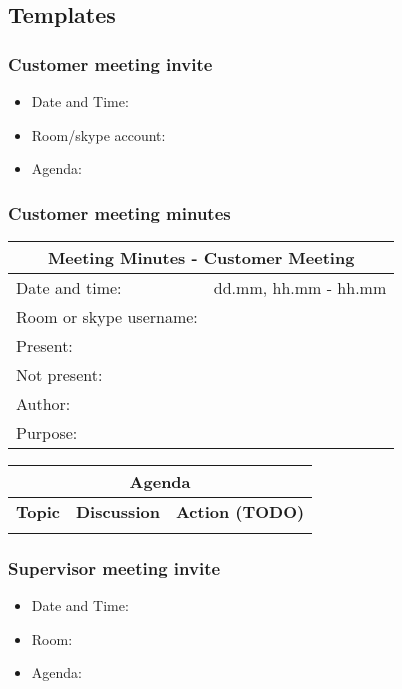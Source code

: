 \subsection{Templates}

\subsubsection{Customer meeting invite}

\begin{itemize}
	\item Date and Time:
	\item Room/skype account:
	\item Agenda:
\end{itemize}

\subsubsection{Customer meeting minutes}
\begin{tabular}{| p{4cm} | p{10cm} |}
	\hline
	\multicolumn{2}{|c|}{\Large \bf Meeting Minutes - Customer Meeting} \\ \hline
	Date and time: & dd.mm,  hh.mm - hh.mm \\ \hline
	Room or skype username: &  \\ \hline
	Present: &  \\ \hline
	Not present: &  \\ \hline
	Author: &  \\ \hline
	Purpose: &  \\ \hline
\end{tabular}

\begin{tabular}{| p{4cm} | p{6cm} | p{4cm} |}
	\hline
	\multicolumn{3}{|c|}{\Large \bf Agenda} \\ \hline
	{\bf Topic} & {\bf Discussion} & {\bf Action (TODO)} \\ \hline
	 & & \\ \hline


\end{tabular}

\subsubsection{Supervisor meeting invite}

\begin{itemize}
	\item Date and Time:
	\item Room:
	\item Agenda:
\end{itemize}

